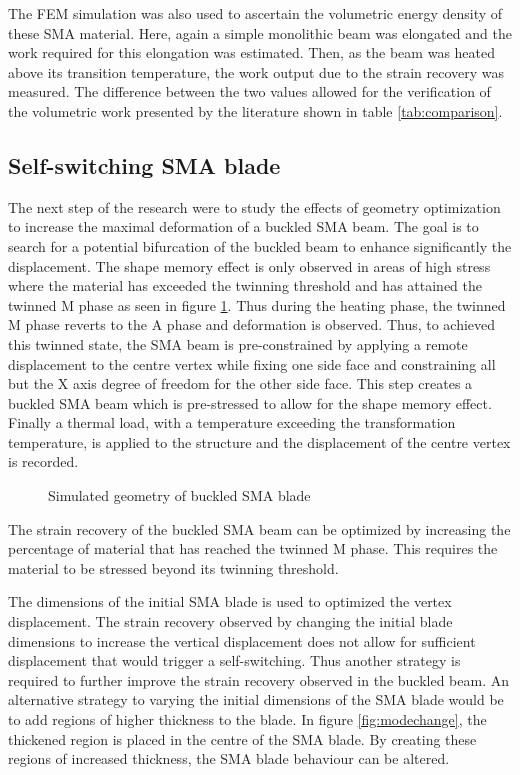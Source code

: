 The FEM simulation was also used to ascertain the volumetric energy density of these SMA material. Here, again a simple monolithic beam was elongated and the work required for this elongation was estimated. Then, as the beam was heated above its transition temperature, the work output due to the strain recovery was measured. The difference between the two values allowed for the verification of the volumetric work presented by the literature shown in table \ref{tab:comparison}.

\subsection{Self-switching SMA blade}
The next step of the research were to study the effects of geometry optimization to increase the maximal deformation of a buckled SMA beam. The goal is to search for a potential bifurcation of the buckled beam to enhance significantly the displacement. The shape memory effect is only observed in areas of high stress where the material has exceeded the twinning threshold and has attained the twinned M phase as seen in figure \ref{fig:FigSMABlade}. Thus during the heating phase, the twinned M phase reverts to the A phase and deformation is observed. Thus, to achieved this twinned state, the SMA beam is pre-constrained by applying a remote displacement to the centre vertex while fixing one side face and constraining all but the X axis degree of freedom for the other side face. This step creates a buckled SMA beam which is pre-stressed to allow for the shape memory effect. Finally a thermal load, with a temperature exceeding the transformation temperature, is applied to the structure and the displacement of the centre vertex is recorded.
\begin{figure}
	\vspace{-10pt}
	\centering
	\def\svgwidth{0.5\textwidth}
	
	\caption{Simulated geometry of buckled SMA blade}
	\vspace{-10pt}
	\label{fig:FigSMABlade}
\end{figure}
The strain recovery of the buckled SMA beam can be optimized by increasing the percentage of material that has reached the twinned M phase. This requires the material to be stressed beyond its twinning threshold.

The dimensions of the initial SMA blade is used to optimized the vertex displacement. The strain recovery observed by changing the initial blade dimensions to increase the vertical displacement does not allow for sufficient displacement that would trigger a self-switching. Thus another strategy is required to further improve the strain recovery observed in the buckled beam. An alternative strategy to varying the initial dimensions of the SMA blade would be to add regions of higher thickness to the blade. In figure \ref{fig:modechange}, the thickened region is placed in the centre of the SMA blade. By creating these regions of increased thickness, the SMA blade behaviour can be altered.

